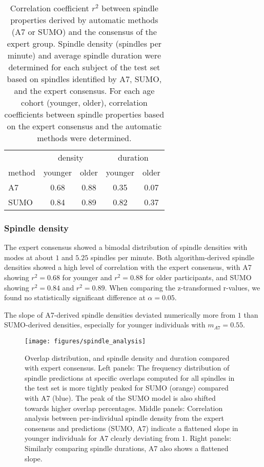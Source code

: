 \documentclass[fleqn,twocolumn,10pt]{wlscirep}
\begin{document}
\begin{table}[t]
	\centering
	\begin{tabular}{@{}lcccc@{}}
		\toprule
		& \multicolumn{2}{c}{density} & \multicolumn{2}{c}{duration} \\
		\cmidrule(l){2-3} \cmidrule(l){4-5}
		method & younger & older & younger & older \\
		\midrule
		A7\cite{Lacourse2019} & 0.68 & 0.88 & 0.35 & 0.07 \\
		SUMO & 0.84 & 0.89 & 0.82 & 0.37 \\
		\bottomrule
	\end{tabular}
	\caption{
		Correlation coefficient $r^2$ between spindle properties derived by
		automatic methods (A7 or SUMO) and the consensus of the expert group.
		Spindle density (spindles per minute) and average spindle
		duration were determined for each subject of the test set based on
		spindles identified by A7, SUMO, and the expert consensus. For each age
		cohort (younger, older), correlation coefficients between spindle
		properties based on the expert consensus and the automatic methods
		were determined.
	}
	\label{tab:moda-correlation}
\end{table}

\subsubsection{Spindle density}

The expert consensus showed a bimodal distribution of spindle densities with
modes at about $1$ and $5.25$ spindles per minute.
Both algorithm-derived spindle densities showed a high level of correlation with
the expert consensus, with A7 showing $r^2=0.68$ for younger and $r^2=0.88$ for
older participants, and SUMO showing  $r^2=0.84$ and $r^2=0.89$.
When comparing the z-transformed r-values, we found no statistically significant
difference at $\alpha=0.05$.

The slope of A7-derived spindle densities deviated numerically more from $1$ than
SUMO-derived densities, especially for younger individuals with $m_{A7}=0.55$.

\begin{figure*}[t]
	\centering
	\texttt{[image: figures/spindle\_analysis]}
	\caption{
		Overlap distribution, and spindle density and duration compared
		with expert consensus.  Left panels: The frequency distribution
		of spindle predictions at specific overlaps computed for all
		spindles in the test set is more tightly peaked for SUMO
		(orange) compared with A7 (blue).  The peak of the SUMO model is
		also shifted towards higher overlap percentages.  Middle
		panels: Correlation analysis between per-individual spindle
		density from the expert consensus and predictions (SUMO, A7)
		indicate a flattened slope in younger individuals for A7
		clearly deviating from $1$.  Right panels: Similarly comparing
                spindle durations, A7 also shows a flattened slope.
	}
	\label{fig:spindle-analysis}
\end{figure*}
\end{document}

